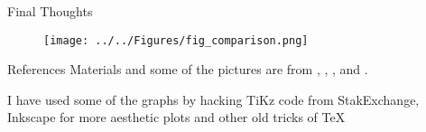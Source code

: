 \documentclass{beamer}
\begin{document}
\begin{frame}{Final Thoughts}
	
 \begin{figure}[h]
	\centering
	\texttt{[image: ../../Figures/fig\_comparison.png]}
\end{figure}
\end{frame}

\begin{frame}{References}
	Materials and some of the pictures are from \citep{James2015}, \citep{genuer}, \citep{dubook}, and \citep{hastie01}.
	\printbibliography 	
	
	I have used some of the graphs by hacking TiKz code from StakExchange, Inkscape for more aesthetic plots and other old tricks of \TeX
	
\end{frame}
\end{document}
